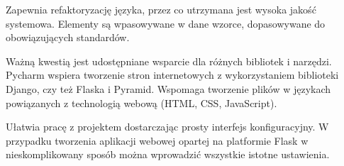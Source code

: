 Zapewnia refaktoryzację języka, przez co utrzymana jest wysoka jakość systemowa. Elementy są wpasowywane w dane wzorce, dopasowywane do obowiązujących standardów.

Ważną kwestią jest udostępniane wsparcie dla różnych bibliotek i narzędzi. Pycharm wspiera tworzenie stron internetowych z wykorzystaniem biblioteki Django, czy też Flaska i Pyramid. Wspomaga tworzenie plików w językach powiązanych z technologią webową (HTML, CSS, JavaScript).

Ułatwia pracę z projektem dostarczając prosty interfejs konfiguracyjny. W przypadku tworzenia aplikacji webowej opartej na platformie Flask w nieskomplikowany sposób można wprowadzić wszystkie istotne ustawienia.






